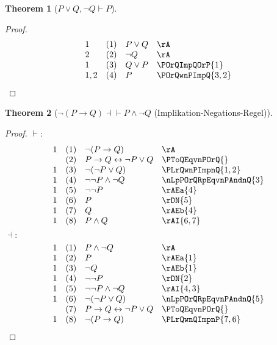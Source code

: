 \documentclass{book}
\theoremstyle{plain}
\newtheorem{theorem}{Theorem}
\theoremstyle{remark}
\theoremstyle{definition}
\begin{document}
\label{POrQwnQImpP}
\begin{theorem}[\(P \lor Q,\neg Q \vdash P\)]
\end{theorem}
\begin{proof}
	\[
	\begin{array}{llll}
		1 & (1) & P \lor Q & \rA \\
	    2 & (2) & \neg Q & \rA \\
        1 & (3) & Q\lor P & \POrQImpQOrP{1} \\
        1,2 & (4) & P & \POrQwnPImpQ{3,2} \\
	\end{array}
	\]
\end{proof}

\label{nLpPToQRpEqvPAndnQ}
\begin{theorem}[\(\neg(P \rightarrow Q) \dashv \vdash P \land \neg Q\) (Implikation-Negations-Regel)]
\end{theorem}
\begin{proof}
	\(\vdash:\)
	\[
	\begin{array}{llll}
		1 & (1) & \neg(P \rightarrow Q) & \rA \\
		& (2) & P \rightarrow Q\leftrightarrow \neg P\lor Q & \PToQEqvnPOrQ{} \\
		1 & (3) & \neg(\neg P \lor Q) & \PLrQwnPImpnQ{1,2}\\
		1 & (4) & \neg\neg P \land \neg Q & \nLpPOrQRpEqvnPAndnQ{3}\\
		1 & (5) & \neg\neg P & \rAEa{4}\\  
		1 & (6) & P & \rDN{5}\\
		1 & (7) & Q & \rAEb{4}\\
		1 & (8) & P\land Q & \rAI{6,7}\\
	\end{array}
	\]
	\(\dashv:\)
	\[
	\begin{array}{llll}
		1 & (1) & P \wedge \neg Q & \rA \\
		1 & (2) & P  & \rAEa{1}\\
		1 & (3) & \neg Q  & \rAEb{1}\\
		1 & (4) & \neg\neg P  & \rDN{2}\\
		1 & (5) & \neg\neg P\land \neg Q  & \rAI{4,3}\\
		1 & (6) & \neg(\neg P\lor Q)  & \nLpPOrQRpEqvnPAndnQ{5}\\
		& (7) & P \rightarrow Q\leftrightarrow \neg P\lor Q & \PToQEqvnPOrQ{} \\
		1 & (8) & \neg (P \rightarrow Q) & \PLrQwnQImpnP{7,6}\\
	\end{array}
	\]		
\end{proof}
\end{document}
